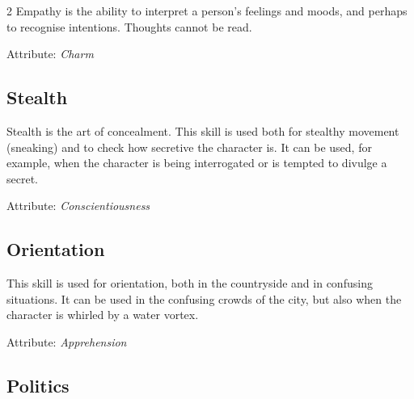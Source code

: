 \begin{multicols}{2}
Empathy is the ability to interpret a person's feelings and moods, and perhaps to recognise intentions. Thoughts cannot be read.

Attribute: \textit{Charm}

\subsection{Stealth}

Stealth is the art of concealment. This skill is used both for stealthy movement (sneaking) and to check how secretive the character is. It can be used, for example, when the character is being interrogated or is tempted to divulge a secret.

Attribute: \textit{Conscientiousness}


\subsection{Orientation}

This skill is used for orientation, both in the countryside and in confusing situations. It can be used in the confusing crowds of the city, but also when the character is whirled by a water vortex.

Attribute: \textit{Apprehension}

\subsection{Politics}


\end{multicols}
